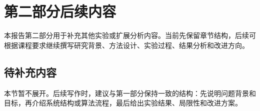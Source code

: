 \section{第二部分\quad 后续内容}

本报告第二部分用于补充其他实验或扩展分析内容。当前先保留章节结构，后续可根据课程要求继续撰写研究背景、方法设计、实验过程、结果分析和改进方向。

\subsection{待补充内容}

本节暂不展开。后续写作时，建议与第一部分保持一致的结构：先说明问题背景和目标，再介绍系统结构或算法流程，最后给出实验结果、局限性和改进方案。
